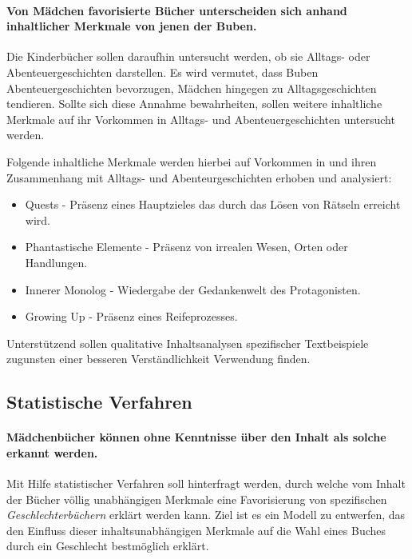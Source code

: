

\paragraph{Von Mädchen favorisierte Bücher unterscheiden sich anhand
inhaltlicher Merkmale von jenen der Buben.}

Die Kinderbücher sollen daraufhin untersucht werden, ob sie Alltags-
oder Abenteuergeschichten darstellen. Es wird vermutet, dass Buben
Abenteuergeschichten bevorzugen, Mädchen hingegen zu Alltagsgeschichten
tendieren. Sollte sich diese Annahme bewahrheiten, sollen weitere
inhaltliche Merkmale auf ihr Vorkommen in Alltags- und
Abenteuergeschichten untersucht werden.

Folgende inhaltliche Merkmale werden hierbei auf Vorkommen in und ihren
Zusammenhang mit Alltags- und Abenteurgeschichten erhoben und
analysiert:

\begin{itemize}
\item
  Quests - Präsenz eines Hauptzieles das durch das Lösen von Rätseln
  erreicht wird.
\item
  Phantastische Elemente - Präsenz von irrealen Wesen, Orten oder
  Handlungen.
\item
  Innerer Monolog - Wiedergabe der Gedankenwelt des Protagonisten.
\item
  Growing Up - Präsenz eines Reifeprozesses.
\end{itemize}

Unterstützend sollen qualitative Inhaltsanalysen spezifischer
Textbeispiele zugunsten einer besseren Verständlichkeit Verwendung
finden.

\subsection{Statistische Verfahren}

\paragraph{Mädchenbücher können ohne Kenntnisse über den Inhalt als
solche erkannt werden.}

Mit Hilfe statistischer Verfahren soll hinterfragt werden, durch welche
vom Inhalt der Bücher völlig unabhängigen Merkmale eine Favorisierung
von spezifischen \emph{Geschlechterbüchern} erklärt werden kann. Ziel
ist es ein Modell zu entwerfen, das den Einfluss dieser
inhaltsunabhängigen Merkmale auf die Wahl eines Buches durch ein
Geschlecht bestmöglich erklärt.

